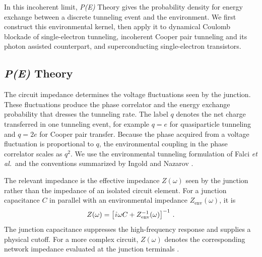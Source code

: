     In this incoherent limit, \textit{P(E)} Theory gives the probability density for energy exchange between a discrete tunneling event and the environment. We first construct this environmental kernel, then apply it to dynamical Coulomb blockade of single-electron tunneling, incoherent Cooper pair tunneling and its photon assisted counterpart, and superconducting single-electron transistors.

    \newpage
    \subsection[P(E) Theory]{\textit{P(E)} Theory}
    \label{subsec:stochastic:pe-theory}

        The circuit impedance determines the voltage fluctuations seen by the junction. These fluctuations produce the phase correlator and the energy exchange probability that dresses the tunneling rate. The label $q$ denotes the net charge transferred in one tunneling event, for example $q=e$ for quasiparticle tunneling and $q=2e$ for Cooper pair transfer. Because the phase acquired from a voltage fluctuation is proportional to $q$, the environmental coupling in the phase correlator scales as $q^2$. We use the environmental tunneling formulation of Falci \textit{et al.}~and the conventions summarized by Ingold and Nazarov \cite{falci_quasiparticle_1991,ingold_charge_1992}.

        The relevant impedance is the effective impedance $Z(\omega)$ seen by the junction rather than the impedance of an isolated circuit element. For a junction capacitance $C$ in parallel with an environmental impedance $Z_\mathrm{env}(\omega)$, it is
        \begin{equation}
            Z(\omega)=\left[\ima\omega C+Z_\mathrm{env}^{-1}(\omega)\right]^{-1}\,.
        \end{equation}
        The junction capacitance suppresses the high-frequency response and supplies a physical cutoff. For a more complex circuit, $Z(\omega)$ denotes the corresponding network impedance evaluated at the junction terminals \cite{falci_quasiparticle_1991,ingold_charge_1992}.


